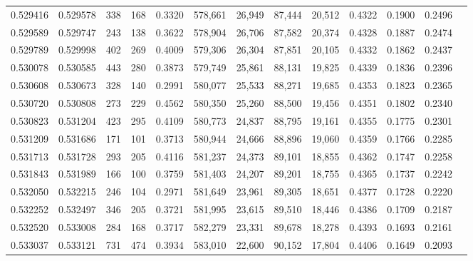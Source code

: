 \begin{tabular}{rrrrrrrrrrrrr}
0.529416 & 0.529578 &   338 &   168 &                                     0.3320 & 578,661 &  26,949 &  87,444 &  20,512 & 0.4322 & 0.1900 & 0.2496 \\
0.529589 & 0.529747 &   243 &   138 &                                     0.3622 & 578,904 &  26,706 &  87,582 &  20,374 & 0.4328 & 0.1887 & 0.2474 \\
0.529789 & 0.529998 &   402 &   269 &                                     0.4009 & 579,306 &  26,304 &  87,851 &  20,105 & 0.4332 & 0.1862 & 0.2437 \\
0.530078 & 0.530585 &   443 &   280 &                                     0.3873 & 579,749 &  25,861 &  88,131 &  19,825 & 0.4339 & 0.1836 & 0.2396 \\
0.530608 & 0.530673 &   328 &   140 &                                     0.2991 & 580,077 &  25,533 &  88,271 &  19,685 & 0.4353 & 0.1823 & 0.2365 \\
0.530720 & 0.530808 &   273 &   229 &                                     0.4562 & 580,350 &  25,260 &  88,500 &  19,456 & 0.4351 & 0.1802 & 0.2340 \\
0.530823 & 0.531204 &   423 &   295 &                                     0.4109 & 580,773 &  24,837 &  88,795 &  19,161 & 0.4355 & 0.1775 & 0.2301 \\
0.531209 & 0.531686 &   171 &   101 &                                     0.3713 & 580,944 &  24,666 &  88,896 &  19,060 & 0.4359 & 0.1766 & 0.2285 \\
0.531713 & 0.531728 &   293 &   205 &                                     0.4116 & 581,237 &  24,373 &  89,101 &  18,855 & 0.4362 & 0.1747 & 0.2258 \\
0.531843 & 0.531989 &   166 &   100 &                                     0.3759 & 581,403 &  24,207 &  89,201 &  18,755 & 0.4365 & 0.1737 & 0.2242 \\
0.532050 & 0.532215 &   246 &   104 &                                     0.2971 & 581,649 &  23,961 &  89,305 &  18,651 & 0.4377 & 0.1728 & 0.2220 \\
0.532252 & 0.532497 &   346 &   205 &                                     0.3721 & 581,995 &  23,615 &  89,510 &  18,446 & 0.4386 & 0.1709 & 0.2187 \\
0.532520 & 0.533008 &   284 &   168 &                                     0.3717 & 582,279 &  23,331 &  89,678 &  18,278 & 0.4393 & 0.1693 & 0.2161 \\
0.533037 & 0.533121 &   731 &   474 &                                     0.3934 & 583,010 &  22,600 &  90,152 &  17,804 & 0.4406 & 0.1649 & 0.2093 \\

\end{tabular}
